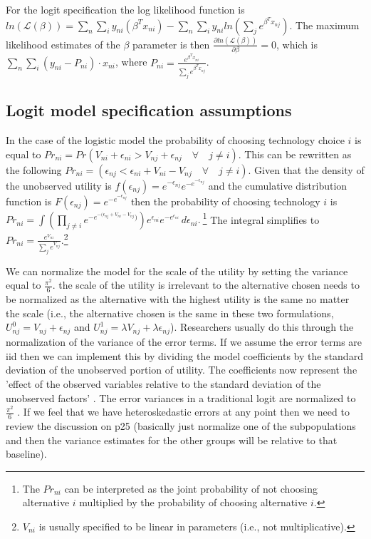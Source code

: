 \documentclass[10pt]{amsart}
\begin{document}
For the logit specification the log likelihood function is $ln(\mathcal{L(\beta)})= \sum_{n} \sum_{i} y_{ni}\left(\beta^{T} x_{ni}\right) - \sum_{n} \sum_{i} y_{ni} ln\left(\sum_{j}e^{\beta^{T}x_{nj}}\right)$.
The maximum likelihood estimates of the $\beta$ parameter is then $\frac{\partial ln\left(\mathcal{L(\beta)}\right)}{\partial \beta} = 0$, which is $\sum_{n}\sum_{i} \left(y_{ni} - P_{ni}\right)\cdot x_{ni}$, where $P_{ni} = \frac{e^{\beta^{T}x_{ni}}}{\sum_{j} e^{\beta^{T}x_{nj}}}$.

\subsection{Logit model specification assumptions}
In the case of the logistic model the probability of choosing technology choice $i$ is equal to $Pr_{ni} = Pr(V_{ni} + \epsilon_{ni} > V_{nj} + \epsilon_{nj} \quad \forall \quad j \neq i)$. 
This can be rewritten as the following $Pr_{ni} = (\epsilon_{nj} <  \epsilon_{ni} + V_{ni} - V_{nj} \quad \forall \quad j \neq i)$.
Given that the density of the unobserved utility is $f(\epsilon_{nj}) = e^{-\epsilon_{nj}}e^{-e^{-\epsilon_{nj}}}$ and the cumulative distribution function is $F(\epsilon_{nj}) = e^{-e^{-\epsilon_{nj}}}$ then the probability of choosing technology $i$ is $Pr_{ni} = \int \left(\prod_{j \neq i} e^{-e^{-(\epsilon_{nj} + V_{ni} - V_{nj}})}\right)e^{\epsilon_{ni}}e^{-e^{\epsilon_{ni}}} \,d\epsilon_{ni}.\ $\footnote{The $Pr_{ni}$ can be interpreted as the joint probability of not choosing alternative $i$ multiplied by the probability of choosing alternative $i$.} 
The integral simplifies to $Pr_{ni} = \frac{e^{V_{ni}}}{\sum_{j} e^{V_{nj}}}$.\footnote{$V_{ni}$ is usually specified to be linear in parameters (i.e., not multiplicative).}

We can normalize the model for the scale of the utility by setting the variance equal to $\frac{\pi^2}{6}$. 
the scale of the utility is irrelevant to the alternative chosen  needs to be normalized as the alternative with the highest utility is the same no matter the scale (i.e., the alternative chosen is the same in these two formulations, $U^0_{nj} = V_{nj} + \epsilon_{nj}$ and $U^1_{nj} = \lambda V_{nj} + \lambda \epsilon_{nj}$).
Researchers usually do this through the normalization of the variance of the error terms. 
If we assume the error terms are iid then we can implement this by dividing the model coefficients by the standard deviation of the unobserved portion of utility.
The coefficients now represent the 'effect of the observed variables relative to the standard deviation of the unobserved factors' \parencite[24]{train:2009aa}.  
The error variances in a traditional logit are normalized to $\frac{\pi^2}{6}$ \parencite{train:2009aa}. 
If we feel that we have heteroskedastic errors at any point then we need to review the discussion on p25 (basically just normalize one of the subpopulations and then the variance estimates for the other groups will be relative to that baseline). 
\end{document}
